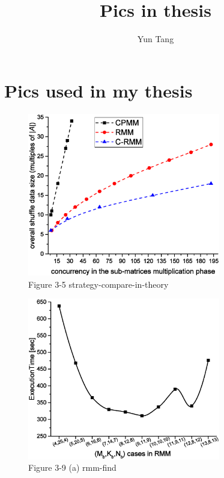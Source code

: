 \documentclass[onecolumn]{ieeetran}
\title{Pics in thesis}
\author{Yun Tang}
\begin{document}
  \section{Pics used in my thesis}
  \label{sec:Pics used in my thesis}

\begin{figure}[ht]
  \centering
  \captionsetup{justification=centering}
  \includegraphics[width=0.75\textwidth]{Figure_3-5_strategy-compare-in-theory.eps}
  \caption{Figure 3-5 strategy-compare-in-theory}\label{Figure_3-5_strategy-compare-in-theory}
\end{figure}

\begin{figure}[ht]
  \centering\captionsetup{justification=centering}
  \includegraphics[width=0.75\textwidth]{Figure_3-9_a_rmm-find.eps}
  \caption{Figure 3-9 (a) rmm-find}\label{rmm}
\end{figure}
\end{document}
